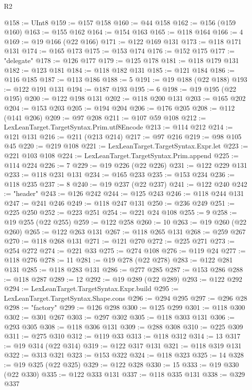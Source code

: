 \begin{lexlean}{R2}
\begin{coremodule}
@158 := UInt8
@159 := @157 @158
@160 := @44 @158
@162 := @156 (@159 @160)
@163 := @155 @162
@164 := @154 @163
@165 := @118 @164
@166 := 4
@169 := @19 @166 (@22 @166)
@171 := @122 @169 @131
@173 := @118 @171 @131
@174 := @165 @173
@175 := @153 @174
@176 := @152 @175
@177 := "delegate"
@178 := @126 @177
@179 := @125 @178
@181 := @118 @179 @131
@182 := @123 @181
@184 := @118 @182 @131
@185 := @121 @184
@186 := @116 @185
@187 := @113 @186
@188 := 5
@191 := @19 @188 (@22 @188)
@193 := @122 @191 @131
@194 := @187 @193
@195 := 6
@198 := @19 @195 (@22 @195)
@200 := @122 @198 @131
@202 := @118 @200 @131
@203 := @165 @202
@204 := @153 @203
@205 := @194 @204
@206 := @176 @205
@208 := @112 (@141 @206)
@209 := @97 @208
@211 := @107 @59 @108
@212 := LexLeanTarget.TargetSyntax.Prim.utf8Encode
@213 := @114 @212
@214 := @121 @131
@216 := @211 (@213 @214)
@217 := @97 @216
@219 := @98 @105 @45
@220 := @219 @108
@221 := LexLeanTarget.TargetSyntax.Expr.let
@223 := @221 @103 @108
@224 := LexLeanTarget.TargetSyntax.Prim.append
@225 := @114 @224
@226 := 7
@229 := @19 @226 (@22 @226)
@231 := @122 @229 @131
@233 := @118 @231 @131
@234 := @165 @233
@235 := @153 @234
@236 := @118 @235
@237 := 8
@240 := @19 @237 (@22 @237)
@241 := @122 @240
@242 := "header"
@243 := @126 @242
@244 := @125 @243
@246 := @118 @244 @131
@247 := @241 @246
@249 := @118 @247 @131
@250 := @236 @249
@251 := @225 @250
@252 := @223 @251
@254 := @221 @24 @108
@255 := 9
@258 := @19 @255 (@22 @255)
@259 := @122 @258
@260 := 10
@263 := @19 @260 (@22 @260)
@265 := @122 @263 @131
@267 := @118 @265 @131
@268 := @259 @267
@270 := @118 @268 @131
@271 := @121 @270
@272 := @225 @271
@273 := @254 @272
@274 := @221 @33
@275 := @274 @108
@276 := @119 @24
@277 := @118 @276
@278 := 11
@281 := @19 @278 (@22 @278)
@283 := @122 @281 @131
@285 := @118 @283 @131
@286 := @277 @285
@287 := @153 @286
@288 := @118 @287
@289 := 12
@292 := @19 @289 (@22 @289)
@293 := @122 @292
@294 := LexLeanTarget.TargetSyntax.Expr.build
@295 := LexLeanTarget.TargetSyntax.Shape.cons
@296 := @294 @295
@297 := @296 @28
@298 := "factory"
@299 := @126 @298
@300 := @125 @299
@301 := @118 @300
@302 := @301 @267
@303 := @297 @302
@305 := @118 @303 @131
@306 := @293 @305
@308 := @118 @306 @131
@309 := @288 @308
@310 := @225 @309
@311 := @275 @310
@312 := @119 @33
@313 := @118 @312
@314 := 13
@317 := @19 @314 (@22 @314)
@319 := @122 @317 @131
@321 := @118 @319 @131
@322 := @313 @321
@323 := @153 @322
@324 := @118 @323
@325 := 14
@328 := @19 @325 (@22 @325)
@329 := @122 @328
@330 := 15
@333 := @19 @330 (@22 @330)
@335 := @122 @333 @131
@337 := @118 @335 @131
@338 := @329 @337

\end{coremodule}
\end{lexlean}
